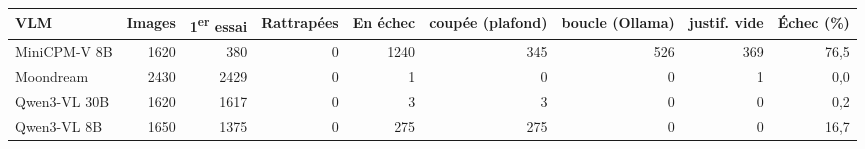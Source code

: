\begin{tabular}{lrrrrrrrr}
\toprule
VLM & Images & 1\textsuperscript{er} essai & Rattrapées & En échec & coupée (plafond) & boucle (Ollama) & justif. vide & Échec (\%) \\
\midrule
MiniCPM-V 8B & 1620 & 380 & 0 & 1240 & 345 & 526 & 369 & 76,5 \\
Moondream & 2430 & 2429 & 0 & 1 & 0 & 0 & 1 & 0,0 \\
Qwen3-VL 30B & 1620 & 1617 & 0 & 3 & 3 & 0 & 0 & 0,2 \\
Qwen3-VL 8B & 1650 & 1375 & 0 & 275 & 275 & 0 & 0 & 16,7 \\
\bottomrule
\end{tabular}
